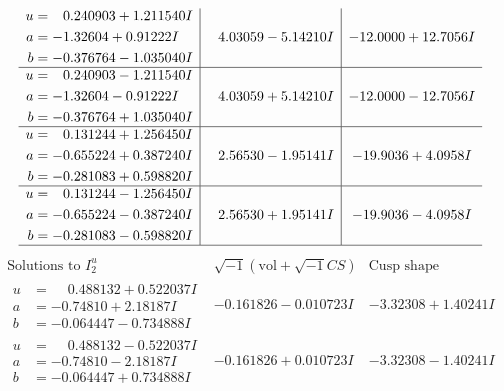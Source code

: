 \documentclass[1p]{elsarticle_modified}
\theoremstyle{definition}
\newcommand{\I}{\sqrt{-1}}
\begin{document}
$$\begin{array}{c|c|c}
\begin{aligned}
u &= \phantom{-}0.240903 + 1.211540 I \\
a &= -1.32604 + 0.91222 I \\
b &= -0.376764 - 1.035040 I\end{aligned}
 & \phantom{-}4.03059 - 5.14210 I & -12.0000 + 12.7056 I \\ \hline\begin{aligned}
u &= \phantom{-}0.240903 - 1.211540 I \\
a &= -1.32604 - 0.91222 I \\
b &= -0.376764 + 1.035040 I\end{aligned}
 & \phantom{-}4.03059 + 5.14210 I & -12.0000 - 12.7056 I \\ \hline\begin{aligned}
u &= \phantom{-}0.131244 + 1.256450 I \\
a &= -0.655224 + 0.387240 I \\
b &= -0.281083 + 0.598820 I\end{aligned}
 & \phantom{-}2.56530 - 1.95141 I & -19.9036 + 4.0958 I \\ \hline\begin{aligned}
u &= \phantom{-}0.131244 - 1.256450 I \\
a &= -0.655224 - 0.387240 I \\
b &= -0.281083 - 0.598820 I\end{aligned}
 & \phantom{-}2.56530 + 1.95141 I & -19.9036 - 4.0958 I\\
 \hline 
 \end{array}$$\newpage$$\begin{array}{c|c|c}  
\text{Solutions to }I^u_{2}& \I (\text{vol} + \sqrt{-1}CS) & \text{Cusp shape}\\
 \hline 
\begin{aligned}
u &= \phantom{-}0.488132 + 0.522037 I \\
a &= -0.74810 + 2.18187 I \\
b &= -0.064447 - 0.734888 I\end{aligned}
 & -0.161826 - 0.010723 I & -3.32308 + 1.40241 I \\ \hline\begin{aligned}
u &= \phantom{-}0.488132 - 0.522037 I \\
a &= -0.74810 - 2.18187 I \\
b &= -0.064447 + 0.734888 I\end{aligned}
 & -0.161826 + 0.010723 I & -3.32308 - 1.40241 I \\ \hline\begin{aligned}

\end{aligned}
\end{array}$$
\end{document}
